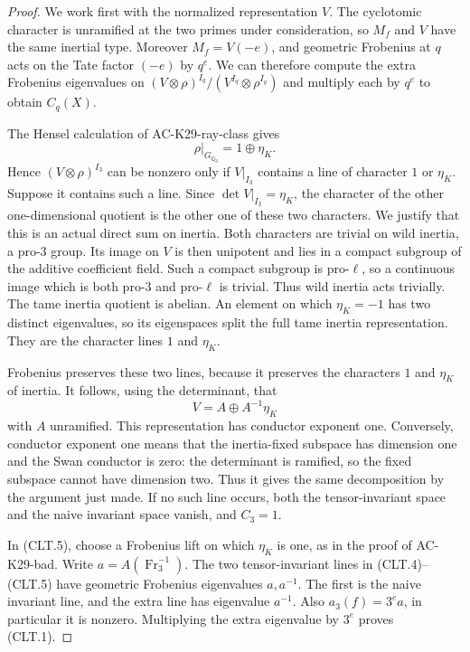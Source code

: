 \begin{proof}
We work first with the normalized representation $V$.
The cyclotomic character is unramified at the two primes
under consideration, so $M_f$ and $V$ have the same
inertial type.  Moreover
$M_f=V(-e)$, and geometric Frobenius at $q$ acts on the
Tate factor $(-e)$ by $q^e$.
We can therefore compute the extra Frobenius eigenvalues
on $(V\otimes\rho)^{I_q}/(V^{I_q}\otimes\rho^{I_q})$
and multiply each by $q^e$ to obtain $C_q(X)$.

The Hensel calculation of AC-K29-ray-class gives
\[
              \rho|_{G_{\mathbb Q_3}}=1\oplus\eta_K.
                                                               \tag{CLT.4}
\]
Hence $(V\otimes\rho)^{I_3}$ can be nonzero only if
$V|_{I_3}$ contains a line of character $1$ or $\eta_K$.
Suppose it contains such a line.  Since
$\det V|_{I_3}=\eta_K$, the character of the other
one-dimensional quotient is the other one of these two
characters.
We justify that this is an actual direct sum on inertia.
Both characters are trivial on wild inertia, a pro-$3$
group.  Its image on $V$ is then unipotent and lies in a
compact subgroup of the additive coefficient field.
Such a compact subgroup is pro-$\ell$, so a continuous
image which is both pro-$3$ and pro-$\ell$ is trivial.
Thus wild inertia acts trivially.
The tame inertia quotient is abelian.  An element on
which $\eta_K=-1$ has two distinct eigenvalues, so its
eigenspaces split the full tame inertia representation.
They are the character lines $1$ and $\eta_K$.

Frobenius preserves these two lines, because it preserves
the characters $1$ and $\eta_K$ of inertia.
It follows, using the determinant, that
\[
              V=A\oplus A^{-1}\eta_K
                                                               \tag{CLT.5}
\]
with $A$ unramified.  This representation has conductor
exponent one.  Conversely, conductor exponent one means
that the inertia-fixed subspace has dimension one and the
Swan conductor is zero: the determinant is ramified, so
the fixed subspace cannot have dimension two.
Thus it gives the same decomposition by the argument
just made.
If no such line occurs, both the tensor-invariant space
and the naive invariant space vanish, and $C_3=1$.

In (CLT.5), choose a Frobenius lift on which
$\eta_K$ is one, as in the proof of AC-K29-bad.
Write $a=A(\operatorname{Fr}_3^{-1})$.
The two tensor-invariant lines in (CLT.4)--(CLT.5)
have geometric Frobenius eigenvalues $a,a^{-1}$.
The first is the naive invariant line, and the extra
line has eigenvalue $a^{-1}$.
Also $a_3(f)=3^e a$, in particular it is nonzero.
Multiplying the extra eigenvalue by $3^e$ proves
(CLT.1).


\end{proof}
